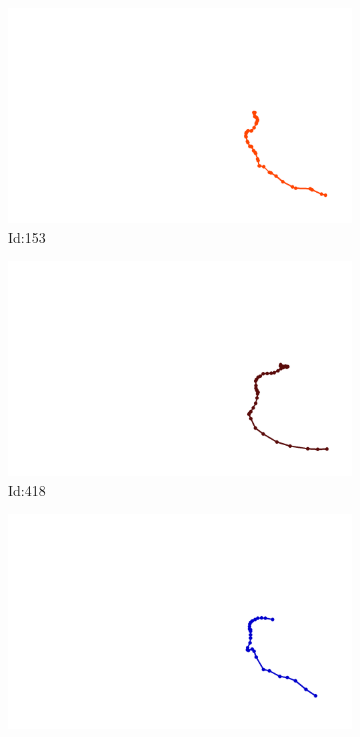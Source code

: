 \documentclass[12pt,twoside]{report}
\begin{document}
\begin{figure}
\centering
\begin{subfigure}[b]{0.20\textwidth}
\centering
\includegraphics[width=\textwidth]{../../trajectories/153.png}
\caption{Id:153}
\end{subfigure}
\begin{subfigure}[b]{0.20\textwidth}
\centering
\includegraphics[width=\textwidth]{../../trajectories/418.png}
\caption{Id:418}
\end{subfigure}
\begin{subfigure}[b]{0.20\textwidth}
\centering
\includegraphics[width=\textwidth]{../../trajectories/424.png}

\end{subfigure}
\end{figure}
\end{document}
